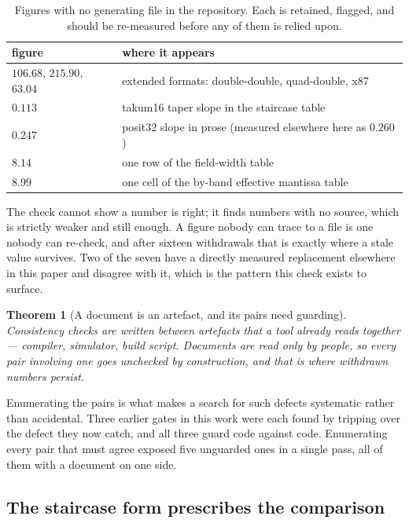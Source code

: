 \documentclass[11pt]{article}
\newtheorem{theorem}{Theorem}
\theoremstyle{definition}
\begin{document}
\begin{table}[t]\centering
\caption{Figures with no generating file in the repository. Each is retained,
flagged, and should be re-measured before any of them is relied upon.}
\label{tab:untraced}
\begin{tabular}{ll}
\toprule
figure & where it appears \\
\midrule
$106.68$, $215.90$, $63.04$ & extended formats: double-double, quad-double, x87 \\
$0.113$ & takum16 taper slope in the staircase table \\
$0.247$ & posit32 slope in prose (measured elsewhere here as $0.260$) \\
$8.14$ & one row of the field-width table \\
$8.99$ & one cell of the by-band effective mantissa table \\
\bottomrule
\end{tabular}
\end{table}

The check cannot show a number is right; it finds numbers with no source, which
is strictly weaker and still enough. A figure nobody can trace to a file is one
nobody can re-check, and after sixteen withdrawals that is exactly where a stale
value survives. Two of the seven have a directly measured replacement elsewhere
in this paper and disagree with it, which is the pattern this check exists to
surface.

\begin{theorem}[A document is an artefact, and its pairs need guarding]
\label{thm:doctrace}
Consistency checks are written between artefacts that a tool already reads
together --- compiler, simulator, build script. Documents are read only by
people, so every pair involving one goes unchecked by construction, and that is
where withdrawn numbers persist.
\end{theorem}

Enumerating the pairs is what makes a search for such defects systematic rather
than accidental. Three earlier gates in this work were each found by tripping
over the defect they now catch, and all three guard code against code.
Enumerating every pair that must agree exposed five unguarded ones in a single
pass, all of them with a document on one side.



\subsection{The staircase form prescribes the comparison}
\label{sec:formprescribes}
\end{document}
